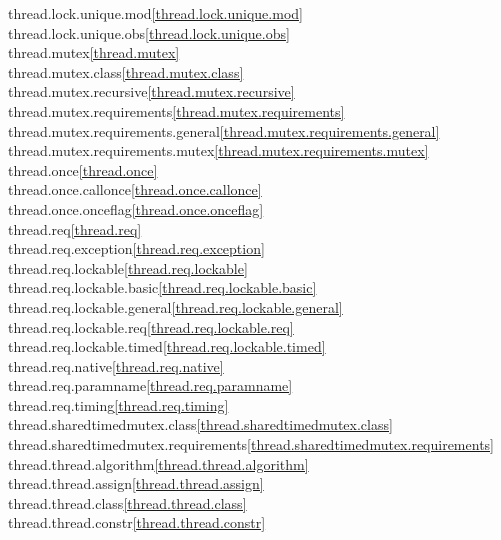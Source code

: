 \begin{multicols}{2}
thread.lock.unique.mod\quad\ref{thread.lock.unique.mod}\\
thread.lock.unique.obs\quad\ref{thread.lock.unique.obs}\\
thread.mutex\quad\ref{thread.mutex}\\
thread.mutex.class\quad\ref{thread.mutex.class}\\
thread.mutex.recursive\quad\ref{thread.mutex.recursive}\\
thread.mutex.requirements\quad\ref{thread.mutex.requirements}\\
thread.mutex.requirements.general\quad\ref{thread.mutex.requirements.general}\\
thread.mutex.requirements.mutex\quad\ref{thread.mutex.requirements.mutex}\\
thread.once\quad\ref{thread.once}\\
thread.once.callonce\quad\ref{thread.once.callonce}\\
thread.once.onceflag\quad\ref{thread.once.onceflag}\\
thread.req\quad\ref{thread.req}\\
thread.req.exception\quad\ref{thread.req.exception}\\
thread.req.lockable\quad\ref{thread.req.lockable}\\
thread.req.lockable.basic\quad\ref{thread.req.lockable.basic}\\
thread.req.lockable.general\quad\ref{thread.req.lockable.general}\\
thread.req.lockable.req\quad\ref{thread.req.lockable.req}\\
thread.req.lockable.timed\quad\ref{thread.req.lockable.timed}\\
thread.req.native\quad\ref{thread.req.native}\\
thread.req.paramname\quad\ref{thread.req.paramname}\\
thread.req.timing\quad\ref{thread.req.timing}\\
thread.sharedtimedmutex.class\quad\ref{thread.sharedtimedmutex.class}\\
thread.sharedtimedmutex.requirements\quad\ref{thread.sharedtimedmutex.requirements}\\
thread.thread.algorithm\quad\ref{thread.thread.algorithm}\\
thread.thread.assign\quad\ref{thread.thread.assign}\\
thread.thread.class\quad\ref{thread.thread.class}\\
thread.thread.constr\quad\ref{thread.thread.constr}\\

\end{multicols}
